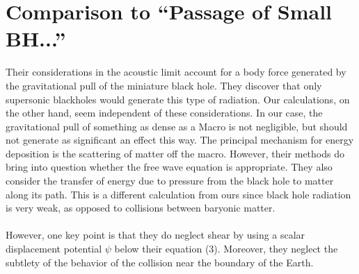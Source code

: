 \documentclass{article}
\begin{document}
\section{Comparison to ``Passage of Small BH...''}
Their considerations in the acoustic limit account for a body force generated by the gravitational pull of the miniature black hole. They discover that only supersonic blackholes would generate this type of radiation. Our calculations, on the other hand, seem independent of these considerations. In our case, the gravitational pull of something as dense as a Macro is not negligible, but should not generate as significant an effect this way. The principal mechanism for energy deposition is the scattering of matter off the macro. However, their methods do bring into question whether the free wave equation is appropriate. They also consider the transfer of energy due to pressure from the black hole to matter along its path. This is a different calculation from ours since black hole radiation is very weak, as opposed to collisions between baryonic matter.
\\\\
However, one key point is that they do neglect shear by using a scalar displacement potential $\psi$ below their equation (3). Moreover, they neglect the subtlety of the behavior of the collision near the boundary of the Earth.

\pagebreak
\end{document}
